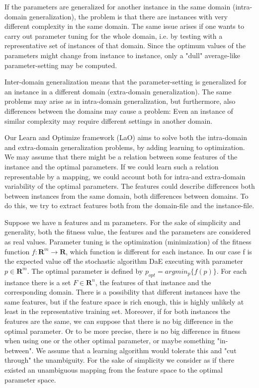 \documentclass{acm_proc_article-sp}
\begin{document}
If the parameters are generalized for another instance in the same domain (intra-domain generalization), the problem is that there are instances with very different complexity in the same domain. The same issue arises if one wants to carry out parameter tuning for the whole domain, i.e. by testing with a representative set of instances of that domain. Since the optimum values of the parameters might change from instance to instance, only a "dull" average-like parameter-setting may be computed.

Inter-domain generalization means that the parameter-setting is generalized for an instance in a different domain (extra-domain generalization). The same problems may arise as in intra-domain generalization, but furthermore, also differences between the domains may cause a problem: Even an instance of similar complexity may require different settings in another domain.

Our Learn and Optimize framework (LaO) aims to solve both the intra-domain and extra-domain generalization problems, by adding learning to optimization. We may assume that there might be a relation between some features of the instance and the optimal parameters. If we could learn such a relation representable by a mapping, we could account both for intra-and extra-domain variability of the optimal parameters. The features could describe differences both between instances from the same domain, both differences between domains. To do this, we try to extract features both from the domain-file and the instance-file.

Suppose we have n features and m parameters. For the sake of simplicity and generality, both the fitness value, the features and the parameters are considered as real values. Parameter tuning is the optimization (minimization) of the fitness function \begin{math}f:\mathbf{R}^m\to \mathbf{R} \end{math}, which function is different for each instance. In our case f is the expected value off the stochastic algorithm DaE executing with parameter \begin{math} p \in \mathbf{R}^m \end{math}. The optimal parameter is defined by \begin{math} p_{opt}=argmin_p\{f(p)\} \end{math}. For each instance there is a set \begin{math} F \in \mathbf{R}^n \end{math}, the features of that instance and the corresponding domain. There is a possibility that different instances have the same features, but if the feature space is rich enough, this is highly unlikely at least in the representative training set. Moreover, if for both instances the features are the same, we can suppose that there is no big difference in the optimal parameter. Or to be more precise, there is no big difference in fitness when using one or the other optimal parameter, or maybe something "in-between". We assume that a learning algorithm would tolerate this and "cut through" the unambiguity. For the sake of simplicity we consider as if there existed an unambiguous mapping from the feature space to the optimal parameter space. 
\end{document}
